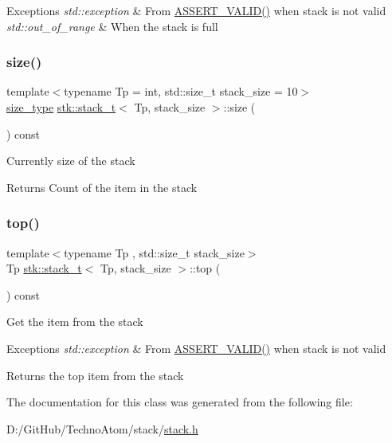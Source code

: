 \begin{DoxyExceptions}{Exceptions}
{\em std\+::exception} & From \hyperlink{stack_8h_a4ad7af85cae2910ffcf6bfbcb8278886}{A\+S\+S\+E\+R\+T\+\_\+\+V\+A\+L\+I\+D()} when stack is not valid \\
\hline
{\em std\+::out\+\_\+of\+\_\+range} & When the stack is full \\
\hline
\end{DoxyExceptions}
\mbox{\label{classstk_1_1stack__t_a50dbd2e6626510af69ba1f38882ca1b5}} 
\subsubsection{\texorpdfstring{size()}{size()}}
{\footnotesize\ttfamily template$<$typename Tp  = int, std\+::size\+\_\+t stack\+\_\+size = 10$>$ \\
\hyperlink{classstk_1_1stack__t_ade199c494a8e4455f76cc04faf138ed8}{size\+\_\+type} \hyperlink{classstk_1_1stack__t}{stk\+::stack\+\_\+t}$<$ Tp, stack\+\_\+size $>$\+::size (\begin{DoxyParamCaption}{ }\end{DoxyParamCaption}) const\hspace{0.3cm}{\ttfamily [inline]}}

Currently size of the stack \begin{DoxyReturn}{Returns}
Count of the item in the stack 
\end{DoxyReturn}
\mbox{\label{classstk_1_1stack__t_a4c8dca98c8f18b9d60398ac75aba5af7}} 
\subsubsection{\texorpdfstring{top()}{top()}}
{\footnotesize\ttfamily template$<$typename Tp , std\+::size\+\_\+t stack\+\_\+size$>$ \\
Tp \hyperlink{classstk_1_1stack__t}{stk\+::stack\+\_\+t}$<$ Tp, stack\+\_\+size $>$\+::top (\begin{DoxyParamCaption}{ }\end{DoxyParamCaption}) const}

Get the item from the stack 
\begin{DoxyExceptions}{Exceptions}
{\em std\+::exception} & From \hyperlink{stack_8h_a4ad7af85cae2910ffcf6bfbcb8278886}{A\+S\+S\+E\+R\+T\+\_\+\+V\+A\+L\+I\+D()} when stack is not valid \\
\hline
\end{DoxyExceptions}
\begin{DoxyReturn}{Returns}
the top item from the stack 
\end{DoxyReturn}


The documentation for this class was generated from the following file\+:\begin{DoxyCompactItemize}
\item 
D\+:/\+Git\+Hub/\+Techno\+Atom/stack/\hyperlink{stack_8h}{stack.\+h}\end{DoxyCompactItemize}
